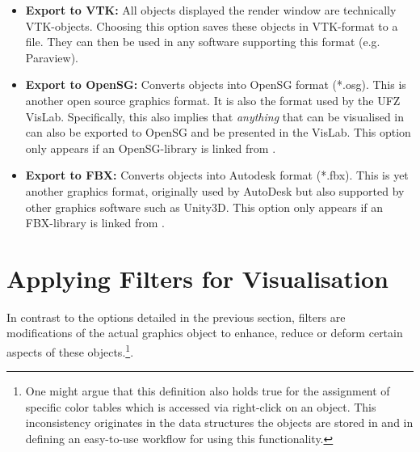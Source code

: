 \begin{itemize}
\item \textbf{Export to VTK:} All objects displayed the render window are technically VTK-objects. Choosing this option saves these objects in VTK-format to a file. They can then be used in any software supporting this format (e.g. Paraview).
\item \textbf{Export to OpenSG:} Converts objects into OpenSG format (*.osg). This is another open source graphics format. It is also the format used by the UFZ VisLab. Specifically, this also implies that \emph{anything} that can be visualised in \ogs can also be exported to OpenSG and be presented in the VisLab. This option only appears if an OpenSG-library is linked from \ogs.
\item \textbf{Export to FBX:} Converts objects into Autodesk format (*.fbx). This is yet another graphics format, originally used by AutoDesk but also supported by other graphics software such as Unity3D. This option only appears if an FBX-library is linked from \ogs.
\end{itemize}

\section{Applying Filters for Visualisation}
\label{filters}

In contrast to the options detailed in the previous section, filters are modifications of the actual graphics object to enhance, reduce or deform certain aspects of these objects.\footnote{One might argue that this definition also holds true for the assignment of specific color tables which is accessed via right-click on an object. This inconsistency originates in the data structures the objects are stored in and in defining an easy-to-use workflow for using this functionality.}.

